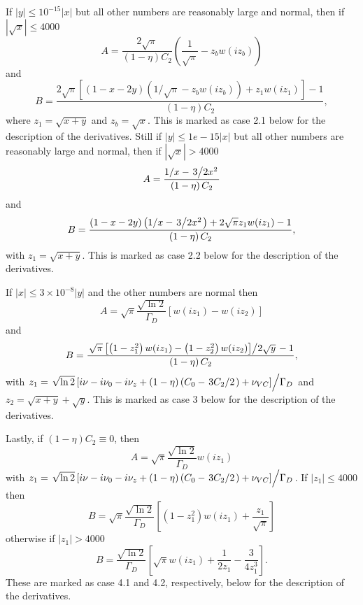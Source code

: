If $|y| \leq 10^{-15}|x|$ but all other numbers are reasonably large and normal,
then if $|\sqrt{x}| \leq 4000$
\begin{equation}
 A = \frac{2\sqrt{\pi}}{\left(1-\eta\right)C_2}
 \left(\frac{1}{\sqrt{\pi}} - z_bw(i z_b)\right)
\end{equation}
and
\begin{equation}
 B = \frac{ 
 2\sqrt{\pi} \left[ \left( 1-x-2y \right) \left(1/\sqrt{\pi} - z_bw(i z_b)\right) +
 z_1w(i z_1)\right] -1}{\left(1-\eta\right)C_2},
\end{equation}
where $z_1 = \sqrt{x+y}$ and $z_b = \sqrt{x}$.  This is marked as case 2.1 below for the description of the derivatives.
Still if $|y| \leq 1e-15|x|$ but all other numbers are reasonably large and normal,
then if $|\sqrt{x}| > 4000$
\begin{equation}
 A = \frac{1/x - \left.3\middle/2x^2\right.}{\left(1-\eta\right)C_2}
\end{equation}
and
\begin{equation}
 B = \frac{ 
  \left( 1-x-2y \right) \left(1/x - \left.3 \middle/ 2x^2\right.\right) +
 2\sqrt{\pi}z_1w(i z_1) -1}{\left(1-\eta\right)C_2},
\end{equation}
with $z_1=\sqrt{x+y}$.  This is marked as case 2.2 below for the description of the derivatives.

If $|x| \leq 3\times10^{-8}|y|$ and the other numbers are normal then
\begin{equation}
 A = \sqrt{\pi}\frac{\sqrt{\ln 2}}{\Gamma_D}\left[w(i z_1) - w(i z_2)\right]
\end{equation}
and
\begin{equation}
 B = \frac{\left.\sqrt{\pi} \left[\left(1-z_1^2\right)w(i z_1) - \left(1-z_2^2\right)w(i z_2) \right] \middle/ 2\sqrt{y}\right. -1}{\left(1-\eta\right)C_2},
\end{equation}
with 
$z_1 =  \left. \sqrt{\ln 2}\left[ i\nu-i\nu_0-i\nu_z + \left(1-\eta\right)\left(C_0 - \left.3C_2\middle/2\right.\right) + \nu_{VC}\right] \middle/ \Gamma_D \right.$ and
$z_2 = \sqrt{x+y} + \sqrt{y}$.  This is marked as case 3 below for the description of the derivatives.

Lastly, if $\left(1-\eta\right)C_2 \equiv 0$, then
\begin{equation}
 A = \sqrt{\pi}\frac{\sqrt{\ln 2}}{\Gamma_D}w(i z_1)
\end{equation}
with $z_1 =  \left. \sqrt{\ln 2}\left[ i\nu-i\nu_0-i\nu_z + \left(1-\eta\right)\left(C_0 - \left.3C_2\middle/2\right.\right) + \nu_{VC}\right] \middle/ \Gamma_D \right.$.
If $|z_1| \leq 4000$ then
\begin{equation}
 B = \sqrt{\pi}\frac{\sqrt{\ln 2}}{\Gamma_D}\left[\left(1 - z_1^2\right) w(i z_1) + \frac{z_1} {\sqrt{\pi}}\right]
\end{equation}
otherwise if $|z_1| > 4000$
\begin{equation}
 B = \frac{\sqrt{\ln 2}}{\Gamma_D} \left[ \sqrt{\pi}w(i z_1) + \frac{1}{2z_1} - \frac{3}{4z_1^3} \right].
\end{equation}
These are marked as case 4.1 and 4.2, respectively, below for the description of the derivatives.

